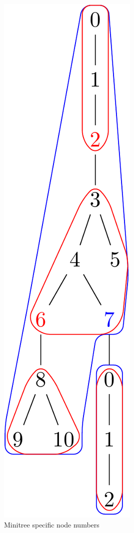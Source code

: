 \documentclass{article}
\begin{document}
\begin{figure}[H]
\begin{subfigure}{2.5cm}
		\includegraphics[scale=0.2]{F3C4Tree}
		\caption{Minitree specific node numbers}
		\label{factory:subim4}
	\end{subfigure}
	\begin{subfigure}{2.5cm}

\end{subfigure}
\end{figure}
\end{document}
